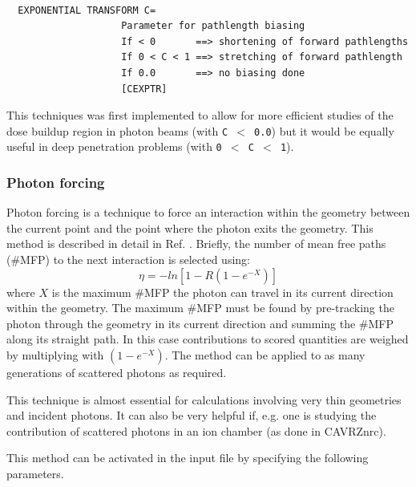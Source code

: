 \documentclass[12pt,twoside]{article}  %
\begin{document}
\begin{verbatim}

  EXPONENTIAL TRANSFORM C=
                    Parameter for pathlength biasing
                    If < 0       ==> shortening of forward pathlengths
                    If 0 < C < 1 ==> stretching of forward pathlength
                    If 0.0       ==> no biasing done
                    [CEXPTR]
\end{verbatim}
This techniques was first implemented to allow for more efficient studies
of the dose buildup region in photon beams\cite{Ro84,RB86} (with {\tt C $<$
0.0}) but it would be equally useful in deep penetration problems (with
{\tt 0 $<$ C $<$ 1}).

\subsubsection{Photon forcing}

Photon forcing is a technique to force an interaction within the geometry
between the current point and the point where the photon exits the
geometry. This method is described in detail in Ref. \cite{RB90}.
Briefly, the number of mean free paths (\#MFP)
to the next interaction is selected using:
\begin{equation}
\eta = - ln \left [ 1 - R (1 - e^{-X}) \right ]
\end{equation}
where $X$ is the maximum \#MFP the photon can travel in its current
direction within the geometry. The maximum \#MFP must be found by
pre-tracking the photon through the geometry in its current direction
and summing the \#MFP along its straight path. In this case contributions
to scored quantities are weighed by multiplying with $(1 - e ^{-X})$.
The method can be applied to as many generations of scattered photons
as required.

This technique is almost essential for calculations involving very thin
geometries and incident photons. It can also be very helpful if, e.g. one
is studying the contribution of scattered photons in an ion chamber (as
done in CAVRZnrc).

This method can be activated in the input file by specifying the following
parameters.
\end{document}
